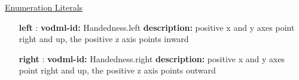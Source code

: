   \noindent \underline{Enumeration Literals}
  \vspace{-\parsep}
  \small
  \begin{itemize}
  
    \item[\textbf{left}]: \textbf{vodml-id:} Handedness.left \newline
          \textbf{description:} positive x and y axes point right and up, the positive z axis points inward
    \item[\textbf{right}]: \textbf{vodml-id:} Handedness.right \newline
          \textbf{description:} positive x and y axes point right and up, the positive z axis points outward
  \end{itemize}
  \normalsize

